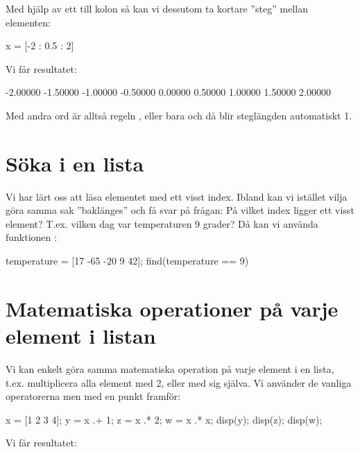 Med hjälp av ett till kolon så kan vi dessutom ta kortare ''steg'' mellan elementen:

\begin{matlab}[caption={Anpassa steglängd mellan element},label={}]
x = [-2 : 0.5 : 2]
\end{matlab}

Vi får resultatet:

\vspace{10pt}
\begin{matlab}
  -2.00000  -1.50000  -1.00000  -0.50000   0.00000   0.50000   1.00000   1.50000   2.00000
\end{matlab}

Med andra ord är alltså regeln , eller bara  och då blir steglängden automatiskt 1.


\section{Söka i en lista}\label{sec:findInList}

Vi har lärt oss att läsa elementet med ett visst index. Ibland kan vi istället vilja göra samma sak ''baklänges'' och få svar på frågan: På vilket index ligger ett visst element? T.ex. vilken dag var temperaturen 9 grader? Då kan vi använda funktionen :

\vspace{10pt}
\begin{matlab}
temperature = [17 -65 -20 9 42];
find(temperature == 9) %
\end{matlab}


\section{Matematiska operationer på varje element i listan}\label{sec:operationerpaenlista}

Vi kan enkelt göra samma matematiska operation på varje element i en lista, t.ex. multiplicera alla element med 2, eller med sig själva. Vi använder de vanliga operatorerna \cw{+ - * /} men med en punkt framför:

\begin{matlab}[caption={Matematiska operationer på varje element i listan},label={}]
x = [1 2 3 4];
y = x .+ 1;
z = x .* 2;
w = x .* x;
disp(y);
disp(z);
disp(w);
\end{matlab}

Vi får resultatet:

